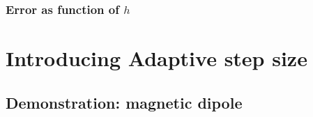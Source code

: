 \documentclass{beamer}
\begin{document}
\begin{frame}
\frametitle{Error as function of $h$}
%
\end{frame}

\section{Introducing Adaptive step size}

\subsection{Demonstration: magnetic dipole}
\end{document}
